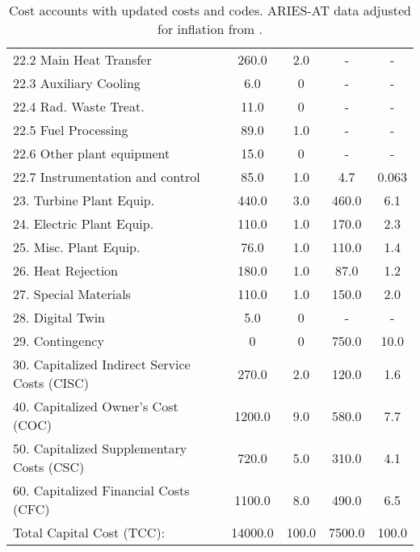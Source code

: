 \begin{table}[h!]
{\begin{tabular}{lcccc}
\hspace{10mm}22.2 Main Heat Transfer & 260.0 & 2.0 & - & - \\
\hspace{10mm}22.3 Auxiliary Cooling & 6.0 & 0 & - & - \\
\hspace{10mm}22.4 Rad. Waste Treat. & 11.0 & 0 & - & - \\
\hspace{10mm}22.5 Fuel Processing & 89.0 & 1.0 & - & - \\
\hspace{10mm}22.6 Other plant equipment & 15.0 & 0 & - & - \\
\hspace{10mm}22.7 Instrumentation and control & 85.0 & 1.0 & 4.7 & 0.063 \\
\hspace{5mm}23. Turbine Plant Equip. & 440.0 & 3.0 & 460.0 & 6.1 \\
\hspace{5mm}24. Electric Plant Equip. & 110.0 & 1.0 & 170.0 & 2.3 \\
\hspace{5mm}25. Misc. Plant Equip. & 76.0 & 1.0 & 110.0 & 1.4 \\
\hspace{5mm}26. Heat Rejection & 180.0 & 1.0 & 87.0 & 1.2 \\
\hspace{5mm}27. Special Materials & 110.0 & 1.0 & 150.0 & 2.0 \\
\hspace{5mm}28. Digital Twin & 5.0 & 0 & - & - \\
\hspace{5mm}29. Contingency & 0 & 0 & 750.0 & 10.0 \\
30. Capitalized Indirect Service Costs (CISC) & 270.0 & 2.0 & 120.0 & 1.6 \\
40. Capitalized Owner’s Cost (COC) & 1200.0 & 9.0 & 580.0 & 7.7 \\
50. Capitalized Supplementary Costs (CSC) & 720.0 & 5.0 & 310.0 & 4.1 \\
60. Capitalized Financial Costs (CFC) & 1100.0 & 8.0 & 490.0 & 6.5 \\
\hline
Total Capital Cost (TCC): & 14000.0 & 100.0 & 7500.0 & 100.0 \\
\hline
\end{tabular}
}
\caption{Cost accounts with updated costs and codes. ARIES-AT data adjusted for inflation from \cite{gordon1986mirror}.}
\label{tab:costs_updated_codes}
\end{table}


